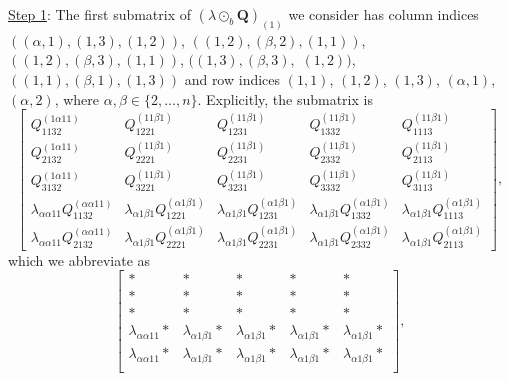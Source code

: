 \documentclass[11pt]{amsart}
\begin{document}
\medskip

\underline{{Step 1}}:
The first submatrix of $(\lambda \odot_b \mathbf{Q})_{(1)}$ we consider has column indices
$((\alpha,1),(1,3),(1,2))$, 
$((1,2),(\beta,2),(1,1))$,
$((1,2),(\beta,3),(1,1))$,
$((1,3),(\beta,3),$ $(1,2))$,
$((1,1),(\beta,1),(1,3))$
and row indices 
$(1,1)$,
$(1,2)$,
$(1,3)$,
$(\alpha,1)$,
$(\alpha,2)$, 
where $\alpha, \beta \in \{2, \ldots, n\}$.
Explicitly, the submatrix \nolinebreak is  
\begin{equation*}
\begin{bmatrix}
{Q}^{(1\alpha11)}_{1132} & {Q}^{(11\beta1)}_{1221} & {Q}^{(11\beta1)}_{1231} & {Q}^{(11\beta1)}_{1332} & {Q}^{(11\beta1)}_{1113} \\[5pt] 
{Q}^{(1\alpha11)}_{2132} & {Q}^{(11\beta1)}_{2221} & {Q}^{(11\beta1)}_{2231} & {Q}^{(11\beta1)}_{2332} & {Q}^{(11\beta1)}_{2113} \\[5pt]
{Q}^{(1\alpha11)}_{3132} & {Q}^{(11\beta1)}_{3221} & {Q}^{(11\beta1)}_{3231} & {Q}^{(11\beta1)}_{3332} & {Q}^{(11\beta1)}_{3113} \\[4pt]
\lambda_{\alpha\alpha11}{Q}^{(\alpha\alpha11)}_{1132} & \lambda_{\alpha1\beta1}{Q}^{(\alpha1\beta1)}_{1221} & \lambda_{\alpha1\beta1}{Q}^{(\alpha1\beta1)}_{1231} & \lambda_{\alpha1\beta1}{Q}^{(\alpha1\beta1)}_{1332} & \lambda_{\alpha1\beta1}{Q}^{(\alpha1\beta1)}_{1113} \\[4pt]
\lambda_{\alpha\alpha11}{Q}^{(\alpha\alpha11)}_{2132} & \lambda_{\alpha1\beta1}{Q}^{(\alpha1\beta1)}_{2221} & \lambda_{\alpha1\beta1}{Q}^{(\alpha1\beta1)}_{2231} & \lambda_{\alpha1\beta1}{Q}^{(\alpha1\beta1)}_{2332} & \lambda_{\alpha1\beta1}{Q}^{(\alpha1\beta1)}_{2113}
\end{bmatrix},
\end{equation*}
which we abbreviate as 
\begin{equation} \label{eq:my-det1}
\begin{bmatrix}
\ast & \ast & \ast & \ast & \ast \\
\ast & \ast & \ast & \ast & \ast \\
\ast & \ast & \ast & \ast & \ast \\
\lambda_{\alpha\alpha11}\ast & \lambda_{\alpha1\beta1}\ast & \lambda_{\alpha1\beta1}\ast & \lambda_{\alpha1\beta1}\ast & \lambda_{\alpha1\beta1}\ast \\
\lambda_{\alpha\alpha11}\ast & \lambda_{\alpha1\beta1}\ast & \lambda_{\alpha1\beta1}\ast & \lambda_{\alpha1\beta1}\ast & \lambda_{\alpha1\beta1}\ast \\
\end{bmatrix},
\end{equation}
\end{document}
